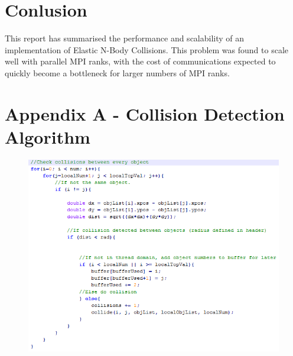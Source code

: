 \documentclass[twoside,twocolumn]{article}
\begin{document}
	
	\section{Conlusion}
	
	This report has summarised the performance and scalability of an implementation of Elastic N-Body Collisions. This problem was found to scale well with parallel MPI ranks, with the cost of communications expected to quickly become a bottleneck for larger numbers of MPI ranks. 
	
	\newpage
	
	\section{Appendix A - Collision Detection Algorithm}
	\begin{figure} [H]
		\includegraphics[scale=.8]{paraCode.png}
	\end{figure}
	
	\clearpage
	
\end{document}
